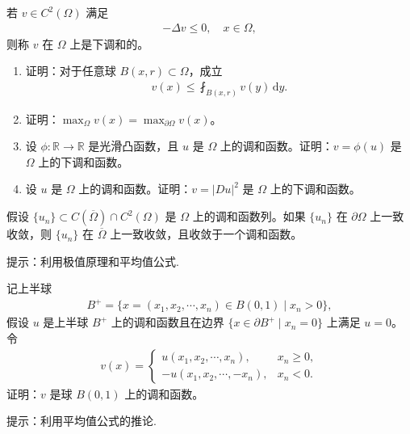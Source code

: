 \documentclass[../../main.tex]{subfiles}%
\begin{document}
\begin{example}
若 $v\in C^2(\Omega)$ 满足
\begin{align*}
-\Delta v \leqslant 0,\quad x\in\Omega,
\end{align*}
则称 $v$ 在 $\Omega$ 上是下调和的。
\begin{enumerate}[(1)]
\item 证明：对于任意球 $B(x,r)\subset\Omega$，成立
\begin{align*}
v(x) \leqslant \fint_{B(x,r)} v(y)\,\mathrm{d}y.
\end{align*}
\item 证明：$\max_{\Omega} v(x) = \max_{\partial\Omega} v(x)$。
\item 设 $\phi:\mathbb{R}\to\mathbb{R}$ 是光滑凸函数，且 $u$ 是 $\Omega$ 上的调和函数。证明：$v=\phi(u)$ 是 $\Omega$ 上的下调和函数。
\item 设 $u$ 是 $\Omega$ 上的调和函数。证明：$v=|Du|^2$ 是 $\Omega$ 上的下调和函数。
\end{enumerate}
\end{example}

\begin{theorem}[Harnack定理]\label{theorem:Harnack定理}
假设 $\{u_n\}\subset C(\overline{\Omega})\cap C^2(\Omega)$ 是 $\Omega$ 上的调和函数列。如果 $\{u_n\}$ 在 $\partial\Omega$ 上一致收敛，则 $\{u_n\}$ 在 $\overline{\Omega}$ 上一致收敛，且收敛于一个调和函数。
\end{theorem}
\begin{note}
提示：利用极值原理和平均值公式.
\end{note}

\begin{theorem}\label{theorem:Schwarz 反射定理}
记上半球
\begin{align*}
B^+ = \{x=(x_1,x_2,\cdots,x_n)\in B(0,1) \mid x_n>0\},
\end{align*}
假设 $u$ 是上半球 $B^+$ 上的调和函数且在边界 $\{x\in\partial B^+ \mid x_n=0\}$ 上满足 $u=0$。令
\begin{align*}
v(x) = \begin{cases}
u(x_1,x_2,\cdots,x_n), & x_n\geqslant 0, \\
-u(x_1,x_2,\cdots,-x_n), & x_n<0.
\end{cases}
\end{align*}
证明：$v$ 是球 $B(0,1)$ 上的调和函数。
\end{theorem}
\begin{note}
提示：利用平均值公式的推论.
\end{note}
\end{document}
